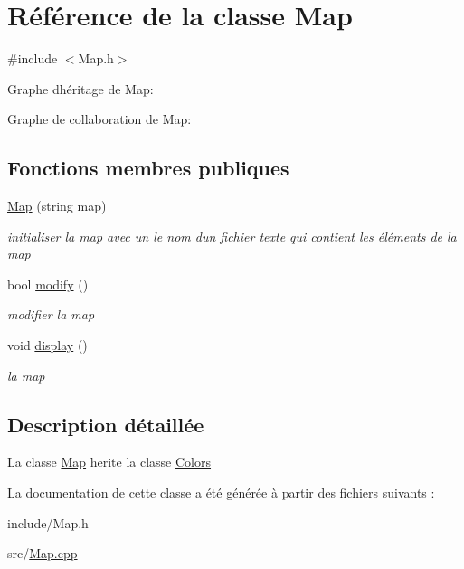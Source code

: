 \hypertarget{class_map}{}\section{Référence de la classe Map}
\label{class_map}


{\ttfamily \#include $<$Map.\+h$>$}



Graphe d\textquotesingle{}héritage de Map\+:


Graphe de collaboration de Map\+:
\subsection*{Fonctions membres publiques}
\begin{DoxyCompactItemize}
\item 
\hyperlink{class_map_ab92768fc2db576bf956f443190b58d90}{Map} (string map)\hypertarget{class_map_ab92768fc2db576bf956f443190b58d90}{}\label{class_map_ab92768fc2db576bf956f443190b58d90}

\begin{DoxyCompactList}\small\item\em initialiser la map avec un le nom d\textquotesingle{}un fichier texte qui contient les éléments de la map \end{DoxyCompactList}\item 
bool \hyperlink{class_map_a922cd70b6032ae3a6a2df04b39398e8e}{modify} ()\hypertarget{class_map_a922cd70b6032ae3a6a2df04b39398e8e}{}\label{class_map_a922cd70b6032ae3a6a2df04b39398e8e}

\begin{DoxyCompactList}\small\item\em modifier la map \end{DoxyCompactList}\item 
void \hyperlink{class_map_ad5fa4af56ebdcfdbfe999ae4ba971135}{display} ()\hypertarget{class_map_ad5fa4af56ebdcfdbfe999ae4ba971135}{}\label{class_map_ad5fa4af56ebdcfdbfe999ae4ba971135}

\begin{DoxyCompactList}\small\item\em la map \end{DoxyCompactList}\end{DoxyCompactItemize}


\subsection{Description détaillée}
La classe \hyperlink{class_map}{Map} herite la classe \hyperlink{class_colors}{Colors} 

La documentation de cette classe a été générée à partir des fichiers suivants \+:\begin{DoxyCompactItemize}
\item 
include/Map.\+h\item 
src/\hyperlink{_map_8cpp}{Map.\+cpp}\end{DoxyCompactItemize}
